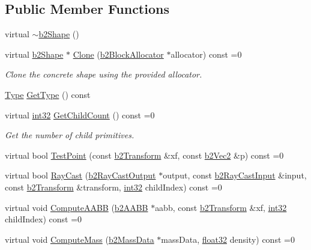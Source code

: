 \subsection*{Public Member Functions}
\begin{DoxyCompactItemize}
\item 
virtual \mbox{\hyperlink{classb2_shape_a7c14c5dcf134d22e0b5790518632d05a}{$\sim$b2\+Shape}} ()
\item 
virtual \mbox{\hyperlink{classb2_shape}{b2\+Shape}} $\ast$ \mbox{\hyperlink{classb2_shape_a4716243454bb9cf7c7ee1d9cb23ae634}{Clone}} (\mbox{\hyperlink{classb2_block_allocator}{b2\+Block\+Allocator}} $\ast$allocator) const =0
\begin{DoxyCompactList}\small\item\em Clone the concrete shape using the provided allocator. \end{DoxyCompactList}\item 
\mbox{\hyperlink{classb2_shape_a4c1f3a9ad6b3150bb90ad9018ca4b1e0}{Type}} \mbox{\hyperlink{classb2_shape_a600cceee6186d81bb1b8ab142324bba6}{Get\+Type}} () const
\item 
virtual \mbox{\hyperlink{b2_settings_8h_a43d43196463bde49cb067f5c20ab8481}{int32}} \mbox{\hyperlink{classb2_shape_a05a3c445017d96df9238ceefe6ce37ab}{Get\+Child\+Count}} () const =0
\begin{DoxyCompactList}\small\item\em Get the number of child primitives. \end{DoxyCompactList}\item 
virtual bool \mbox{\hyperlink{classb2_shape_a6ac968e403e2d93e8ae46d728a2e50fa}{Test\+Point}} (const \mbox{\hyperlink{structb2_transform}{b2\+Transform}} \&xf, const \mbox{\hyperlink{structb2_vec2}{b2\+Vec2}} \&p) const =0
\item 
virtual bool \mbox{\hyperlink{classb2_shape_aee53a926f4fe64cd03693f6211ef6335}{Ray\+Cast}} (\mbox{\hyperlink{structb2_ray_cast_output}{b2\+Ray\+Cast\+Output}} $\ast$output, const \mbox{\hyperlink{structb2_ray_cast_input}{b2\+Ray\+Cast\+Input}} \&input, const \mbox{\hyperlink{structb2_transform}{b2\+Transform}} \&transform, \mbox{\hyperlink{b2_settings_8h_a43d43196463bde49cb067f5c20ab8481}{int32}} child\+Index) const =0
\item 
virtual void \mbox{\hyperlink{classb2_shape_a88e9807fab0c8ca9a98d8926e50a1411}{Compute\+A\+A\+BB}} (\mbox{\hyperlink{structb2_a_a_b_b}{b2\+A\+A\+BB}} $\ast$aabb, const \mbox{\hyperlink{structb2_transform}{b2\+Transform}} \&xf, \mbox{\hyperlink{b2_settings_8h_a43d43196463bde49cb067f5c20ab8481}{int32}} child\+Index) const =0
\item 
virtual void \mbox{\hyperlink{classb2_shape_a61b365526241b47f124789b0309cac69}{Compute\+Mass}} (\mbox{\hyperlink{structb2_mass_data}{b2\+Mass\+Data}} $\ast$mass\+Data, \mbox{\hyperlink{b2_settings_8h_aacdc525d6f7bddb3ae95d5c311bd06a1}{float32}} density) const =0
\end{DoxyCompactItemize}
